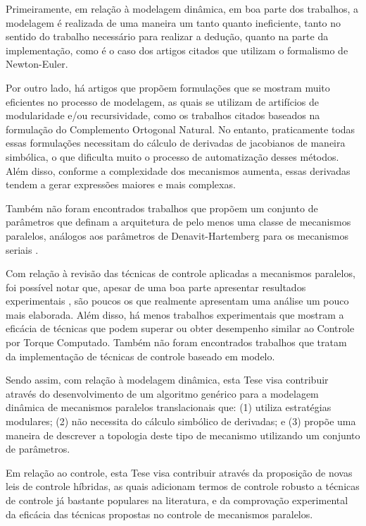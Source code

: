 \documentclass[]{politex}
\begin{document}
Primeiramente, em relação à modelagem dinâmica, em boa parte dos trabalhos, a modelagem é realizada de uma maneira um tanto quanto ineficiente, tanto no sentido do trabalho necessário para realizar a dedução, quanto na parte da implementação, como é o caso dos artigos citados que utilizam o formalismo de Newton-Euler. 

Por outro lado, há artigos que propõem formulações que se mostram muito eficientes no processo de modelagem, as quais se utilizam de artifícios de modularidade e/ou recursividade, como os trabalhos citados baseados na formulação do Complemento Ortogonal Natural. No entanto, praticamente todas essas formulações necessitam do cálculo de derivadas de jacobianos de maneira simbólica, o que dificulta muito o processo de automatização desses métodos. Além disso, conforme a complexidade dos mecanismos aumenta, essas derivadas tendem a gerar expressões maiores e mais complexas.

Também não foram encontrados trabalhos que propõem um conjunto de parâmetros que definam a arquitetura de pelo menos uma classe de mecanismos paralelos, análogos aos parâmetros de Denavit-Hartemberg para os mecanismos seriais \cite{Denavit}.

Com relação à revisão das técnicas de controle aplicadas a mecanismos paralelos, foi possível notar que, apesar de uma boa parte apresentar resultados experimentais \cite{Honegger, Cheng, Shang, Yen, Codourey, Vivas, Duchaine, Chemori, Begon}, são poucos os que realmente apresentam uma análise um pouco mais elaborada. Além disso, há menos trabalhos experimentais que mostram a eficácia de técnicas que podem superar ou obter desempenho similar ao Controle por Torque Computado. Também não foram encontrados trabalhos que tratam da implementação de técnicas de controle baseado em modelo. %

Sendo assim, com relação à modelagem dinâmica, esta Tese visa contribuir através do desenvolvimento de um algoritmo genérico para a modelagem dinâmica de mecanismos paralelos translacionais que: (1) utiliza estratégias modulares; (2) não necessita do cálculo simbólico de derivadas; e (3) propõe uma maneira de descrever a topologia deste tipo de mecanismo utilizando um conjunto de parâmetros.

Em relação ao controle, esta Tese visa contribuir através da proposição de novas leis de controle híbridas, as quais adicionam termos de controle robusto a técnicas de controle já bastante populares na literatura, e da comprovação experimental da eficácia das técnicas propostas no controle de mecanismos paralelos.
\end{document}
